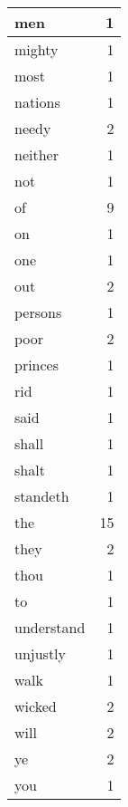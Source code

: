 \begin{center}
\begin{longtable}{l|r}
men & 1 \\ \hline
mighty & 1 \\ \hline
most & 1 \\ \hline
nations & 1 \\ \hline
needy & 2 \\ \hline
neither & 1 \\ \hline
not & 1 \\ \hline
of & 9 \\ \hline
on & 1 \\ \hline
one & 1 \\ \hline
out & 2 \\ \hline
persons & 1 \\ \hline
poor & 2 \\ \hline
princes & 1 \\ \hline
rid & 1 \\ \hline
said & 1 \\ \hline
shall & 1 \\ \hline
shalt & 1 \\ \hline
standeth & 1 \\ \hline
the & 15 \\ \hline
they & 2 \\ \hline
thou & 1 \\ \hline
to & 1 \\ \hline
understand & 1 \\ \hline
unjustly & 1 \\ \hline
walk & 1 \\ \hline
wicked & 2 \\ \hline
will & 2 \\ \hline
ye & 2 \\ \hline
you & 1 \\ \hline
\end{longtable}
\end{center}



\normalsize



